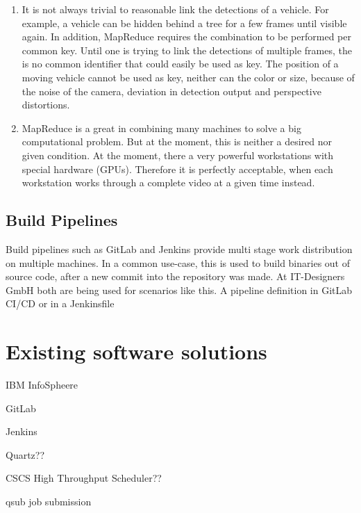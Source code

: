 \begin{enumerate}
	\item It is not always trivial to reasonable link the detections of a vehicle.
	For example, a vehicle can be hidden behind a tree for a few frames until visible again.
	In addition, MapReduce requires the combination to be performed per common key.
	Until one is trying to link the detections of multiple frames, the is no common identifier that could easily be used as key.
	The position of a moving vehicle cannot be used as key, neither can the color or size, because of the noise of the camera, deviation in detection output and perspective distortions.
	\item MapReduce is a great in combining many machines to solve a big computational problem.
	But at the moment, this is neither a desired nor given condition. At the moment, there a  very powerful workstations with special hardware (GPUs).
	Therefore it is perfectly acceptable, when each workstation works through a complete video at a given time instead.
\end{enumerate}

\subsection{Build Pipelines}

Build pipelines such as GitLab\cite{gitlab:main} and Jenkins\cite{jenkins:main} provide multi stage work distribution on multiple machines.
In a common use-case, this is used to build binaries out of source code, after a new commit into the  repository was made.
At IT-Designers GmbH both are being used for scenarios like this.
A pipeline definition in GitLab CI/CD \cite{gitlab:ci:yaml} or in a Jenkinsfile \cite{jenkins:pipeline:jenkinsfile}


\section{Existing software solutions}

IBM InfoSpheere
\cite{infosphere:datastage}

GitLab \cite{gitlab:ci:yaml}

Jenkins \cite{jenkins:pipeline:jenkinsfile}

Quartz?? \cite{quartz:quickstart}

CSCS High Throughput Scheduler?? \cite{cscs:high_throughput}


qsub job submission %




